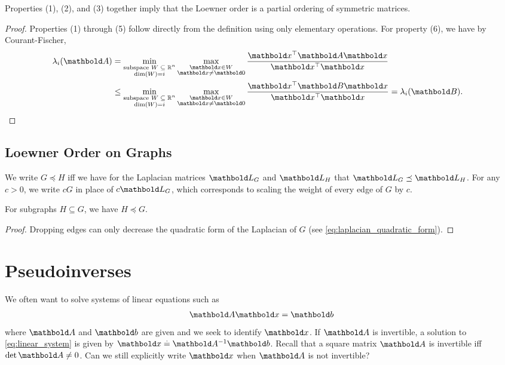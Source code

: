 \begin{rmk}
Properties (1), (2), and (3) together imply that the Loewner order is a partial ordering of symmetric matrices.
\end{rmk}
\begin{proof} Properties (1) through (5) follow directly from the definition using only elementary operations. For property (6), we have by Courant-Fischer, \begin{align*}
    \lambda_i(\mA) &= \min_{\substack{\text{subspace $\sW \subseteq \R^n$} \\ \dim(\sW) = i}} \max_{\substack{\vx \in \sW \\ \vx \neq \vZero}} \frac{\trans{\vx}\mA\vx}{\trans{\vx}\vx} \\
    &\leq \min_{\substack{\text{subspace $\sW \subseteq \R^n$} \\ \dim(\sW) = i}} \max_{\substack{\vx \in \sW \\ \vx \neq \vZero}} \frac{\trans{\vx}\mB\vx}{\trans{\vx}\vx} = \lambda_i(\mB). &\qedhere
\end{align*}
\end{proof}

\subsection{Loewner Order on Graphs}

\begin{defn} We write $G \preceq H$ iff we have for the Laplacian matrices $\mL_G$ and $\mL_H$ that $\mL_G \preceq \mL_H$. For any $c > 0$, we write $c G$ in place of $c \mL_G$, which corresponds to scaling the weight of every edge of $G$ by $c$.
\end{defn}
\begin{lem} For subgraphs $H \subseteq G$, we have $H \preceq G$.
\end{lem}
\begin{proof} Dropping edges can only decrease the quadratic form of the Laplacian of $G$ (see \cref{eq:laplacian_quadratic_form}).
\end{proof}

\section{Pseudoinverses}

We often want to solve systems of linear equations such as \begin{align}
    \mA\vx = \vb \label{eq:linear_system}
\end{align} where $\mA$ and $\vb$ are given and we seek to identify $\vx$. If $\mA$ is invertible, a solution to \cref{eq:linear_system} is given by $\vx \defeq \inv{\mA}\vb$. Recall that a square matrix $\mA$ is invertible iff $\det\mA \neq 0$. Can we still explicitly write $\vx$ when $\mA$ is not invertible?

